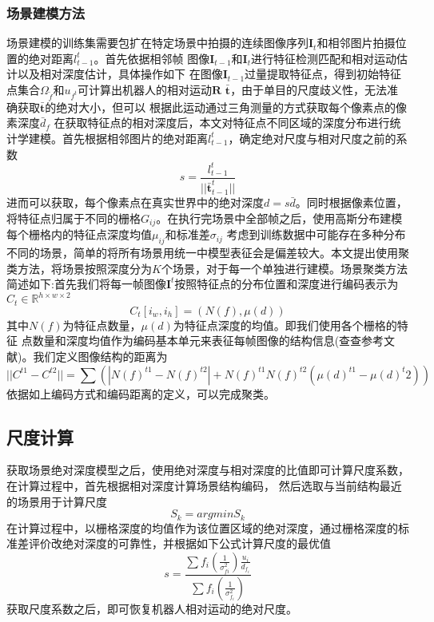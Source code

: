 \subsubsection{场景建模方法}
场景建模的训练集需要包扩在特定场景中拍摄的连续图像序列${\textbf{I}_t}$和相邻图片拍摄位置的绝对距离$l_{t-1}^t$。首先依据相邻帧
图像$\textbf{I}_{t-1}$和$\textbf{I}_t$进行特征检测匹配和相对运动估计以及相对深度估计，具体操作如下
在图像$\textbf{I}_{t-1}$过量提取特征点，得到初始特征点集合$\Omega_{\tilde{f}}$和$u_{f^{t}}$可计算出机器人的相对运动$\textbf{R}$ $\bar{\textbf{t}}$，由于单目的尺度歧义性，无法准确获取$\bar{\textbf{t}}$的绝对大小，但可以
根据此运动通过三角测量的方式获取每个像素点的像素深度$\bar{d}_f$
在获取特征点的相对深度后，本文对特征点不同区域的深度分布进行统计学建模。首先根据相邻图片的绝对距离$l_{t-1}^t$，确定绝对尺度与相对尺度之前的系数
\begin{equation}
    s = \frac{l_{t-1}^t}{||\bar{\textbf{t}}_{t-1}^t||}
\end{equation}
进而可以获取，每个像素点在真实世界中的绝对深度$d =\textit{s}\bar{d}$。同时根据像素位置，将特征点归属于不同的栅格$G_{ij}$。在执行完场景中全部帧之后，使用高斯分布建模每个栅格内的特征点深度均值$\mu_{ij}$和标准差$\sigma_{ij}$
考虑到训练数据中可能存在多种分布不同的场景，简单的将所有场景用统一中模型表征会是偏差较大。本文提出使用聚类方法，将场景按照深度分为$K$个场景，对于每一个单独进行建模。场景聚类方法简述如下:首先我们将每一帧图像$\textbf{I}^t$按照特征点的分布位置和深度进行编码表示为$C_t \in \mathbb{R}^{h×w×2}$
\begin{equation}
    C_t[i_w,i_h] = (N(f),\mu(d))
\end{equation}
其中$N(f)$为特征点数量，$μ(d)$为特征点深度的均值。即我们使用各个栅格的特征
点数量和深度均值作为编码基本单元来表征每帧图像的结构信息(查查参考文献)。我们定义图像结构的距离为
\begin{equation}
    ||C^{t1}-C^{t2}|| = \sum(|N(f)^{t1}-N(f)^{t2}|+N(f)^{t1}N(f)^{t2}(\mu(d)^{t1}-\mu(d)^t2))    
\end{equation}
依据如上编码方式和编码距离的定义，可以完成聚类。
\subsection{尺度计算}
获取场景绝对深度模型之后，使用绝对深度与相对深度的比值即可计算尺度系数，在计算过程中，首先根据相对深度计算场景结构编码，
然后选取与当前结构最近的场景用于计算尺度
\begin{equation}
    S_k = argmin S_k
\end{equation}
在计算过程中，以栅格深度的均值作为该位置区域的绝对深度，通过栅格深度的标准差评价改绝对深度的可靠性，并根据如下公式计算尺度的最优值
\begin{equation}
    s = \frac{\sum f_i(\frac{1}{\sigma_{fi}^2})\frac{u_i}{d_{f_i}}}{\sum f_i(\frac{1}{\sigma_{f_i}^2})}
\end{equation}
获取尺度系数之后，即可恢复机器人相对运动的绝对尺度。

